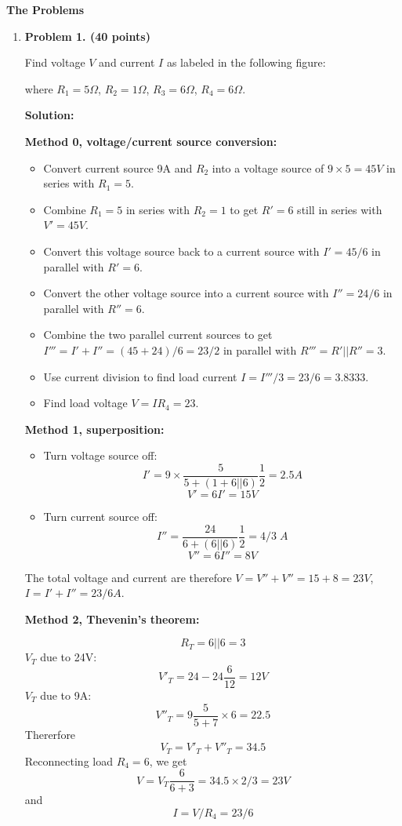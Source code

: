 {\bf The Problems}
\begin{enumerate}


\item {\bf Problem 1. (40 points)}

  Find voltage $V$ and current $I$ as labeled in the following figure:


  where $R_1=5\Omega$, $R_2=1\Omega$, $R_3=6\Omega$, $R_4=6\Omega$.

  {\bf Solution:}

  {\bf Method 0, voltage/current source conversion:}
  \begin{itemize}
  \item Convert current source 9A and $R_2$ into a voltage source of $9\times 5=45V$
    in series with $R_1=5$. 
  \item Combine $R_1=5$ in series with $R_2=1$ to get $R'=6$ still in series with 
    $V'=45V$. 
  \item Convert this voltage source back to a current source with $I'=45/6$ in 
    parallel with $R'=6$. 
  \item Convert the other voltage source into a current source with $I''=24/6$ in
    parallel with $R''=6$.
  \item Combine the two parallel current sources to get $I'''=I'+I''=(45+24)/6=23/2$
    in parallel with $R'''=R'||R''=3$.
  \item Use current division to find load current $I=I'''/3=23/6=3.8333$.
  \item Find load voltage $V=IR_4=23$.
  \end{itemize}

  {\bf Method 1, superposition:}
    \begin{itemize}
    \item Turn voltage source off:
      \[ I'=9\times\frac{5}{5+(1+6||6)}\frac{1}{2}=2.5A \]
      \[ V'=6I'=15 V \]
    \item Turn current source off:
      \[ I''=\frac{24}{6+(6||6)}\frac{1}{2}=4/3\;A \]
      \[ V''=6I''=8V \]
  \end{itemize}
  The total voltage and current are therefore $V=V''+V''=15+8=23V$,
  $I=I'+I''=23/6A$.

  {\bf Method 2, Thevenin's theorem:}
  
  \[ R_T=6||6=3 \]
  $V_T$ due to 24V:
  \[ V'_T=24-24 \frac{6}{12}=12V \]
  $V_T$ due to 9A:
  \[ V''_T=9\frac{5}{5+7}\times 6=22.5 \]
  Thererfore
  \[ V_T=V'_T+V''_T=34.5 \]
  Reconnecting load $R_4=6$, we get
  \[ V=V_T \frac{6}{6+3}=34.5\times 2/3=23 V \]
  and
  \[ I=V/R_4=23/6 \]


\end{enumerate}
